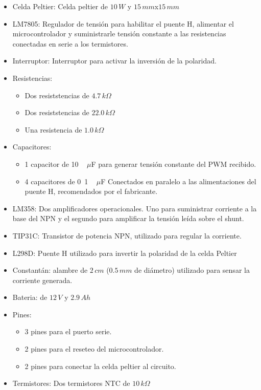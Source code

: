 \documentclass[10pt,spanish,a4paper,openany,notitlepage]{article}
\begin{document}
\begin{itemize}
\item{Celda Peltier:} Celda peltier de $10\, \unit{W}$ y $15\, \unit{mm}$x$15\,\unit{mm}$ 
\item{LM7805:} Regulador de tensión para habilitar el puente H, alimentar
el microcontrolador y suministrarle tensión constante a las resistencias conectadas
en serie a los termistores.
\item{Interruptor:} Interruptor para activar la inversión de la polaridad.
\item{Resistencias:}
	\begin{itemize}
	\item Dos resiststencias de $4.7\,\unit{k\Omega}$
	\item Dos resiststencias de $22.0\,\unit{k\Omega}$
	\item Una resistencia de $1.0\,\unit{k\Omega}$
	\end{itemize}
\item{Capacitores:} 
	\begin{itemize}
	\item 1 capacitor de \unit{10\, \unit{$\mu$F}} para generar
	tensión constante del PWM recibido.
	\item 4 capacitores de \unit{0.1\, \unit{$\mu$F}} Conectados en paralelo
	a las alimentaciones del puente H, recomendados por el fabricante. 
	\end{itemize}
\item{LM358:} Dos amplificadores operacionales. Uno para suministrar corriente
a la base del NPN y el segundo para amplificar la tensión leída sobre el shunt. 
\item{TIP31C:} Transistor de potencia NPN, utilizado para regular la corriente.
\item{L298D:} Puente H utilizado para invertir la polaridad de la celda Peltier
\item{Constantán:} alambre de $2\, \unit{cm}$ ($0.5\, \unit{mm}$ de diámetro) utilizado para sensar la corriente generada.
\item{Bateria:} de $12\, \unit{V}$ y $2.9\, \unit{Ah}$
\item{Pines:}
	\begin{itemize}
	\item 3 pines para el puerto serie.
	\item 2 pines para el reseteo del microcontrolador.
	\item 2 pines para conectar la celda peltier al circuito.
	\end{itemize}
\item{Termistores:} Dos termistores NTC de $10\, \unit{k\Omega}$
\end{itemize}
\end{document}
